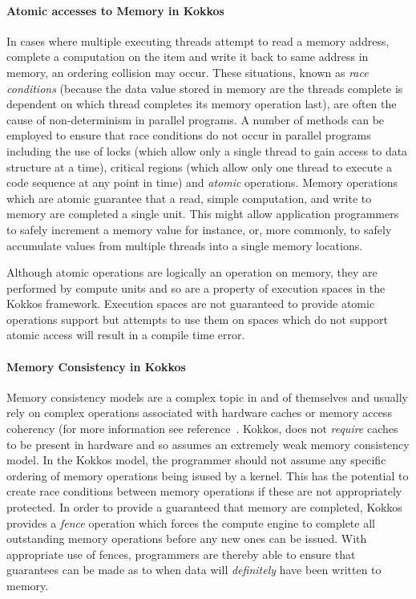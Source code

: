 \paragraph{Atomic accesses to Memory in Kokkos}

In cases where multiple executing threads attempt to read
a memory address, complete a computation on the item and
write it back to same address in memory, an ordering
collision may occur. These situations, known as
{\em race conditions} (because the data value
stored in memory are the threads complete is dependent
on which thread completes its memory operation last),
are often the cause of non-determinism in parallel
programs. A number of methods can be employed to ensure
that race conditions do not occur in parallel programs
including the use of locks (which allow only a single
thread to gain access to data structure at a time),
critical regions (which allow only one thread to execute
a code sequence at any point in time) and {\em atomic}
operations. Memory operations which are atomic guarantee
that a read, simple computation, and write to memory
are completed a single unit. This might allow application
programmers to safely increment a memory value for instance,
or, more commonly, to safely accumulate values from multiple
threads into a single memory locations.

Although atomic operations are logically an operation
on memory, they are performed by compute units and so
are a property of execution spaces in the Kokkos framework.
Execution spaces are not guaranteed to provide atomic
operations support but attempts to use them on spaces
which do not support atomic access will result in 
a compile time error.


\paragraph{Memory Consistency in Kokkos}

Memory consistency models are a complex topic in and of themselves
and usually rely on complex operations associated with hardware
caches or memory access coherency (for more information 
see reference~\cite{handp_hardware}. 
Kokkos, does not {\em require} caches to be present
in hardware and so assumes an extremely weak memory consistency
model. In the Kokkos model, the programmer should not assume any
specific ordering of memory operations being isused by a
kernel. This has the potential to create race conditions between
memory operations if these are not appropriately protected. In
order to provide a guaranteed that memory are completed, Kokkos
provides a {\em fence} operation which forces the compute 
engine to complete all outstanding memory operations before
any new ones can be issued. With appropriate use of fences,
programmers are thereby able to ensure that guarantees can
be made as to when data will {\em definitely} have been 
written to memory.



